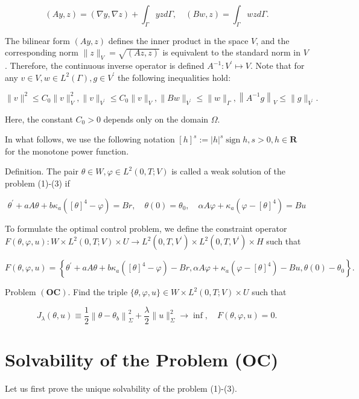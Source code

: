 \documentclass[10pt]{article}
\begin{document}
$$
(A y, z)=(\nabla y, \nabla z)+\int_{\Gamma} y z d \Gamma, \quad(B w, z)=\int_{\Gamma} w z d \Gamma .
$$

The bilinear form $(A y, z)$ defines the inner product in the space $V$, and the corresponding norm $\|z\|_{V}=\sqrt{(A z, z)}$ is equivalent to the standard norm in $V$. Therefore, the continuous inverse operator is defined $A^{-1}: V^{\prime} \mapsto V$. Note that for any $v \in V, w \in L^{2}(\Gamma), g \in V^{\prime}$ the following inequalities hold:

$$
\|v\|^{2} \leq C_{0}\|v\|_{V}^{2},\|v\|_{V^{\prime}} \leq C_{0}\|v\|_{V},\|B w\|_{V^{\prime}} \leq\|w\|_{\Gamma},\left\|A^{-1} g\right\|_{V} \leq\|g\|_{V^{\prime}} .
$$

Here, the constant $C_{0}>0$ depends only on the domain $\Omega$.

In what follows, we use the following notation $[h]^{s}:=|h|^{s} \operatorname{sign} h, s>0, h \in \mathbf{R}$ for the monotone power function.

Definition. The pair $\theta \in W, \varphi \in L^{2}(0, T ; V)$ is called a weak solution of the problem (1)-(3) if

$$
\theta^{\prime}+a A \theta+b \kappa_{a}\left([\theta]^{4}-\varphi\right)=B r, \quad \theta(0)=\theta_{0}, \quad \alpha A \varphi+\kappa_{a}\left(\varphi-[\theta]^{4}\right)=B u
$$

To formulate the optimal control problem, we define the constraint operator $F(\theta, \varphi, u): W \times L^{2}(0, T ; V) \times U \rightarrow L^{2}\left(0, T, V^{\prime}\right) \times L^{2}\left(0, T, V^{\prime}\right) \times H$ such that

$$
F(\theta, \varphi, u)=\left\{\theta^{\prime}+a A \theta+b \kappa_{a}\left([\theta]^{4}-\varphi\right)-B r, \alpha A \varphi+\kappa_{a}\left(\varphi-[\theta]^{4}\right)-B u, \theta(0)-\theta_{0}\right\} .
$$

Problem $(\mathbf{O C})$. Find the triple $\{\theta, \varphi, u\} \in W \times L^{2}(0, T ; V) \times U$ such that

$$
J_{\lambda}(\theta, u) \equiv \frac{1}{2}\left\|\theta-\theta_{b}\right\|_{\Sigma}^{2}+\frac{\lambda}{2}\|u\|_{\Sigma}^{2} \rightarrow \inf , \quad F(\theta, \varphi, u)=0 .
$$

\section{Solvability of the Problem (OC)}
Let us first prove the unique solvability of the problem (1)-(3).
\end{document}

